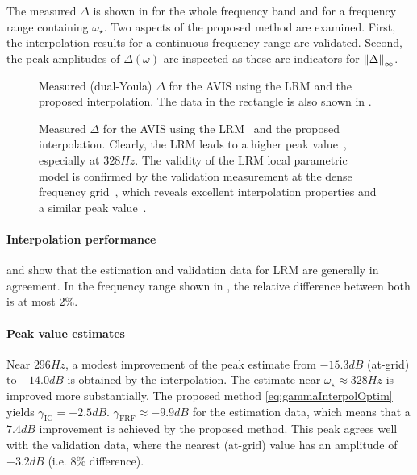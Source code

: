 The measured $\Delta$ is shown in  for the whole frequency band and  for a frequency range containing $\omega_{\star}$.
Two aspects of the proposed method are examined.
First, the interpolation results for a continuous frequency range are validated.
Second, the peak amplitudes of $\Delta(\omega)$ are inspected as these are  indicators for $\left\| \Delta \right\|_{\infty}$.

\begin{figure}
 \centering
    \setlength{\figurewidth}{0.75\columnwidth}
    \setlength{\figureheight}{0.68\figurewidth}
 \caption[$\Delta$ of the , estimated using local modeling.]{Measured (dual-Youla) $\Delta$ for the \gls{AVIS} using the \gls{LRM} and the proposed interpolation. The data in the rectangle is also shown in .}
\label{fig:avisMeas}
\end{figure}

\begin{figure}
 \centering
    \setlength{\figurewidth}{0.75\columnwidth}
    \setlength{\figureheight}{0.68\figurewidth}
   
 \caption[$\Delta$ of the , estimated using local modeling (detail).]{Measured $\Delta$ for the \gls{AVIS} using the \gls{LRM}~ and the proposed interpolation. Clearly, the \gls{LRM} leads to a higher peak value~, especially at $328\unit{Hz}$. The validity of the LRM local parametric model is confirmed by the validation measurement at the dense frequency grid~, which reveals excellent interpolation properties and a similar peak value~.}
\label{fig:avisMeasZoom}
\end{figure}

\paragraph*{Interpolation performance}
\label{sec:avis-interpol}
 and  show that the estimation and validation data for \gls{LRM} are generally in agreement.
In the frequency range shown in , the relative difference between both is at most $2\%$.

\paragraph*{Peak value estimates}
\label{sec:avis-peak-value}
Near $296\unit{Hz}$, a modest improvement of the peak estimate from $-15.3 \unit{dB}$ (at-grid) to $-14.0 \unit{dB}$ is obtained by the interpolation.
The estimate near $\omega_{\star} \approx 328\unit{Hz}$ is improved more substantially.
The proposed method \eqref{eq:gammaInterpolOptim} yields $\gamma_{\mathrm{IG}}=-2.5\unit{dB}$.
$\gamma_{\mathrm{FRF}}\approx -9.9\unit{dB}$ for the estimation data, which means that a $7.4\unit{dB}$ improvement is achieved by the proposed method.
This peak agrees well with the validation data, where the nearest (at-grid) value has an amplitude of $-3.2\unit{dB}$ (i.e. $8\%$ difference).

